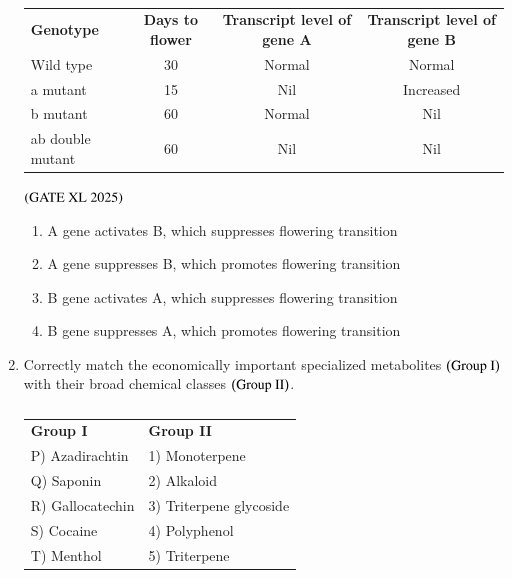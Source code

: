 \documentclass[journal]{IEEEtran}
\begin{document}
\begin{enumerate}
    \begin{table}[H]
        \centering
        \begin{tabular}{lccc}
            \textbf{Genotype} & \textbf{Days to flower} & \textbf{Transcript level of gene A} & \textbf{Transcript level of gene B} \\
            Wild type   & 30 & Normal & Normal \\
            a mutant    & 15 & Nil    & Increased \\
            b mutant    & 60 & Normal & Nil \\
            ab double mutant & 60 & Nil    & Nil \\
        \end{tabular}
        \caption*{}
        \label{tab:xl2025_q58}
    \end{table}

    \hfill $\left(\text{GATE XL 2025}\right)$
    \begin{enumerate}
        \item A gene activates B, which suppresses flowering transition
        \item A gene suppresses B, which promotes flowering transition
        \item B gene activates A, which suppresses flowering transition
        \item B gene suppresses A, which promotes flowering transition
    \end{enumerate}

    \item Correctly match the economically important specialized metabolites $\left(\text{Group I}\right)$ with their broad chemical classes $\left(\text{Group II}\right)$.

    \begin{table}[H]
        \centering
        \begin{tabular}{ll}
            \textbf{Group I} & \textbf{Group II} \\
            P) Azadirachtin   & 1) Monoterpene \\
            Q) Saponin        & 2) Alkaloid \\
            R) Gallocatechin  & 3) Triterpene glycoside \\
            S) Cocaine        & 4) Polyphenol \\
            T) Menthol        & 5) Triterpene \\
        \end{tabular}
        \caption*{}
        \label{tab:xl2025_q59}
    \end{table}


\end{enumerate}
\end{document}
